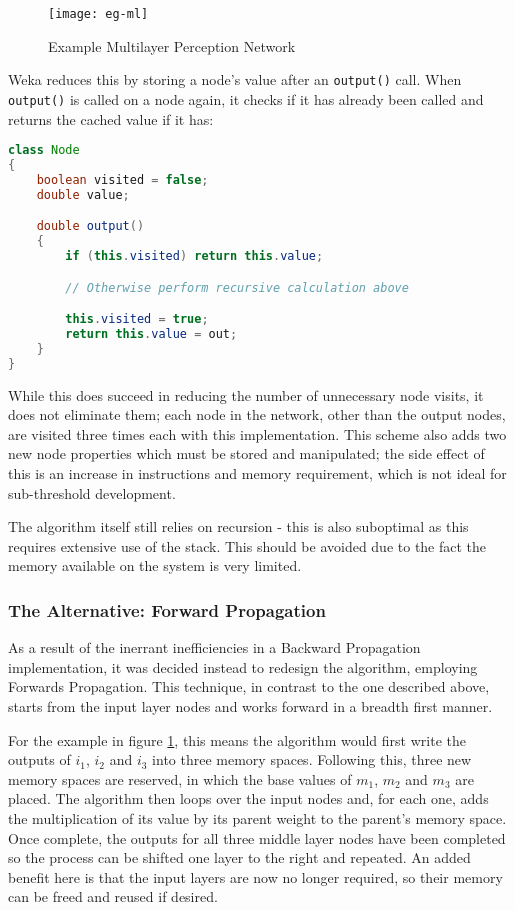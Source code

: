 \begin{figure}[!h]
    \centering
    \texttt{[image: eg-ml]}
    \caption{Example Multilayer Perception Network}
    \label{fig:eg-ml}
\end{figure}

Weka reduces this by storing a node's value after an \verb|output()| call. When \verb|output()| is called on a node again, it checks if it has already been called and returns the cached value if it has:

\begin{lstlisting}[language=Java,caption={Weka's method of preventing repeated calculations}]
class Node
{
    boolean visited = false;
    double value;

    double output()
    {
        if (this.visited) return this.value;

        // Otherwise perform recursive calculation above

        this.visited = true;
        return this.value = out;
    }
}
\end{lstlisting}

While this does succeed in reducing the number of unnecessary node visits, it does not eliminate them; each node in the network, other than the output nodes, are visited three times each with this implementation. This scheme also adds two new node properties which must be stored and manipulated; the side effect of this is an increase in instructions and memory requirement, which is not ideal for sub-threshold development.

The algorithm itself still relies on recursion - this is also suboptimal as this requires extensive use of the stack. This should be avoided due to the fact the memory available on the system is very limited.

\subsubsection{The Alternative: Forward Propagation}

As a result of the inerrant inefficiencies in a Backward Propagation implementation, it was decided instead to redesign the algorithm, employing Forwards Propagation. This technique, in contrast to the one described above, starts from the input layer nodes and works forward in a breadth first manner.

For the example in figure \ref{fig:eg-ml}, this means the algorithm would first write the outputs of $i_1$, $i_2$ and $i_3$ into three memory spaces. Following this, three new memory spaces are reserved, in which the base values of $m_1$, $m_2$ and $m_3$ are placed. The algorithm then loops over the input nodes and, for each one, adds the multiplication of its value by its parent weight to the parent's memory space. Once complete, the outputs for all three middle layer nodes have been completed so the process can be shifted one layer to the right and repeated. An added benefit here is that the input layers are now no longer required, so their memory can be freed and reused if desired.

